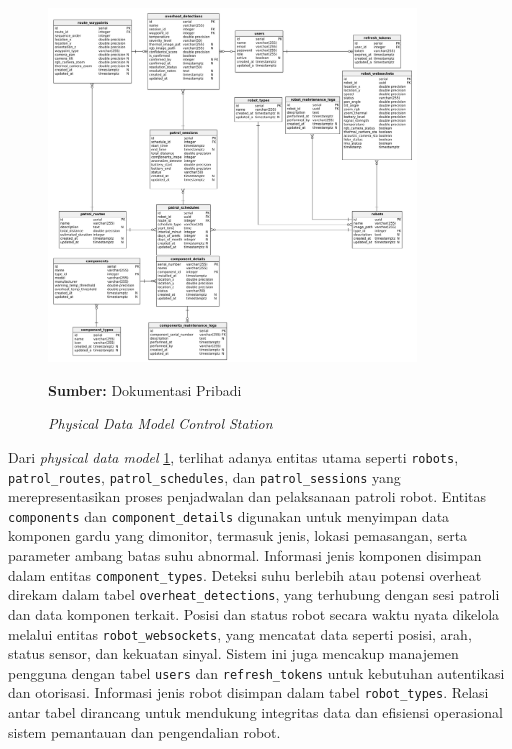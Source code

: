 \begin{figure}[H]
  \centering
  \includegraphics[width=0.87\textwidth]{gambar/bab3/pdm.png}
  \caption{\emph{Physical Data Model} \emph{Control Station}}
  \label{fig:physical-data-model}
  \footnotesize{\textbf{Sumber:} Dokumentasi Pribadi}
\end{figure}

\sloppy
Dari \emph{physical data model} \ref{fig:physical-data-model}, terlihat adanya entitas utama seperti \texttt{robots}, \texttt{patrol\_routes}, \texttt{patrol\_schedules}, dan \texttt{patrol\_sessions} yang merepresentasikan proses penjadwalan dan pelaksanaan patroli robot. Entitas \texttt{components} dan \texttt{component\_details} digunakan untuk menyimpan data komponen gardu yang dimonitor, termasuk jenis, lokasi pemasangan, serta parameter ambang batas suhu abnormal. Informasi jenis komponen disimpan dalam entitas \texttt{component\_types}. Deteksi suhu berlebih atau potensi overheat direkam dalam tabel \texttt{overheat\_detections}, yang terhubung dengan sesi patroli dan data komponen terkait. Posisi dan status robot secara waktu nyata dikelola melalui entitas \texttt{robot\_websockets}, yang mencatat data seperti posisi, arah, status sensor, dan kekuatan sinyal. Sistem ini juga mencakup manajemen pengguna dengan tabel \texttt{users} dan \texttt{refresh\_tokens} untuk kebutuhan autentikasi dan otorisasi. Informasi jenis robot disimpan dalam tabel \texttt{robot\_types}. Relasi antar tabel dirancang untuk mendukung integritas data dan efisiensi operasional sistem pemantauan dan pengendalian robot.

